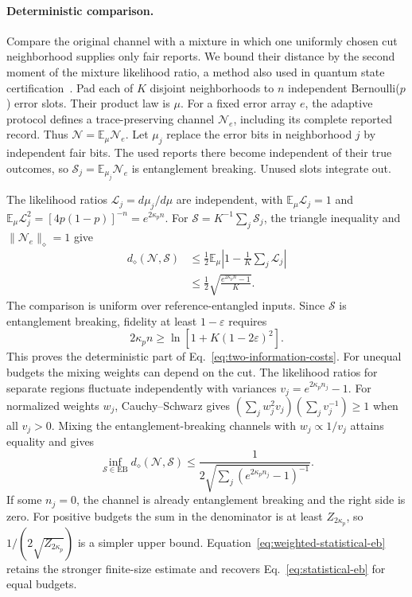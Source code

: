 \documentclass[aps,prl,twocolumn,superscriptaddress,longbibliography,reprint,floatfix]{revtex4-2}
\newcommand{\eps}{\varepsilon}
\newcommand{\channel}{\mathcal N}
\begin{document}
\paragraph*{Deterministic comparison.}
Compare the original channel with a mixture in which one uniformly
chosen cut neighborhood supplies only fair reports. We bound their
distance by the second moment of the mixture likelihood ratio, a
method also used in quantum state certification~\cite{ChenLiODonnell2022}.
Pad each of $K$ disjoint neighborhoods to $n$ independent
Bernoulli($p$) error slots. Their product law is $\mu$.
For a fixed error array $e$, the adaptive protocol defines a
trace-preserving channel $\channel_e$, including its complete
reported record. Thus $\channel=\mathbb E_\mu\channel_e$.
Let $\mu_j$ replace the error bits in neighborhood $j$ by independent
fair bits. The used reports there become independent of their true
outcomes, so $\mathcal S_j=\mathbb E_{\mu_j}\channel_e$ is entanglement
breaking. Unused slots integrate out.

The likelihood ratios $\mathcal L_j=d\mu_j/d\mu$ are independent, with
$\mathbb E_\mu\mathcal L_j=1$ and
$\mathbb E_\mu\mathcal L_j^2=[4p(1-p)]^{-n}=e^{2\kappa_p n}$.
For $\mathcal S=K^{-1}\sum_j\mathcal S_j$, the triangle inequality
and $\|\channel_e\|_\diamond=1$ give
\begin{equation}
 \begin{aligned}
 d_\diamond(\channel,\mathcal S)
 &\le\frac12\mathbb E_\mu\left|1-\frac1K\sum_j\mathcal L_j\right|\\
 &\le\frac12\sqrt{\frac{e^{2\kappa_p n}-1}{K}} .
 \end{aligned}
 \label{eq:statistical-eb}
\end{equation}
The comparison is uniform over reference-entangled inputs.
Since $\mathcal S$ is entanglement breaking, fidelity at least
$1-\eps$ requires
\begin{equation}
 2\kappa_p n\ge\ln[1+K(1-2\eps)^2].
 \label{eq:detector-resource}
\end{equation}
This proves the deterministic part of Eq.~\eqref{eq:two-information-costs}.
For unequal budgets the mixing weights can depend on the cut.
The likelihood ratios for separate regions fluctuate independently
with variances $v_j=e^{2\kappa_p n_j}-1$.
For normalized weights $w_j$, Cauchy--Schwarz gives
$(\sum_j w_j^2v_j)(\sum_j v_j^{-1})\ge1$ when all $v_j>0$.
Mixing the entanglement-breaking channels with $w_j\propto 1/v_j$
attains equality and gives
\begin{equation}
 \inf_{\mathcal S\in\mathrm{EB}}
 d_\diamond(\channel,\mathcal S)
 \le\frac{1}{2\sqrt{\displaystyle\sum_j
                      (e^{2\kappa_p n_j}-1)^{-1}}}.
 \label{eq:weighted-statistical-eb}
\end{equation}
If some $n_j=0$, the channel is already entanglement breaking and the
right side is zero. For positive budgets the sum in the denominator is at
least $Z_{2\kappa_p}$, so $1/(2\sqrt{Z_{2\kappa_p}})$ is a simpler upper
bound. Equation~\eqref{eq:weighted-statistical-eb} retains the stronger
finite-size estimate and recovers Eq.~\eqref{eq:statistical-eb} for equal budgets.
\end{document}
